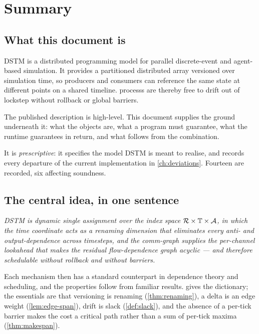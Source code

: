 \chapter*{Summary}

\section*{What this document is}

DSTM \cite{dstm2026} is a distributed programming model for parallel
discrete-event and agent-based simulation. It provides a partitioned
distributed array versioned over simulation time, so producers and consumers
can reference the same state at different points on a shared timeline.
\Glspl{process} are thereby free to \gls{drift} out of lockstep without
rollback or global \glspl{barrier}.

The published description is high-level. This document supplies the ground
underneath it: what the objects are, what a program must guarantee, what the
runtime guarantees in return, and what follows from the combination.

It is \emph{prescriptive}: it specifies the model DSTM is meant to realise,
and records every departure of the current implementation in
\cref{ch:deviations}. Fourteen are recorded, six affecting soundness.

\section*{The central idea, in one sentence}

\begin{center}
\begin{minipage}{0.9\textwidth}
\itshape
DSTM is dynamic single assignment over the index space
$\mathcal{R} \times \mathbb{T} \times \mathcal{A}$, in which the time coordinate acts as a
renaming dimension that eliminates every anti- and output-dependence across
timesteps, and the \gls{comm-graph} supplies the per-channel \gls{lookahead} that makes
the residual flow-dependence graph acyclic --- and therefore schedulable
without rollback and without \glspl{barrier}.
\end{minipage}
\end{center}

Each mechanism then has a standard counterpart in dependence theory and
scheduling, and the properties follow from familiar results.
 gives the dictionary; the essentials are that
versioning is renaming (\cref{thm:renaming}), a \gls{delta} is an edge weight
(\cref{lem:edge-span}), \gls{drift} is slack (\cref{def:slack}), and the
absence of a per-tick \gls{barrier} makes the cost a critical path rather than
a sum of per-tick maxima (\cref{thm:makespan}).

